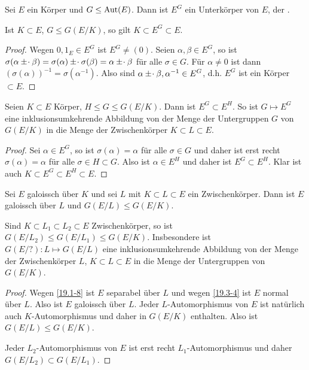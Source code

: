 \begin{lem} \label{19.4-9}
	Sei $E$ ein Körper und $G \le \operatorname{Aut}(E)$.
	Dann ist $E^G$ ein Unterkörper von $E$, der .
	\begin{note}
		Ist $K \subset E$, $G \le G(E / K)$, so gilt $K \subset E^G \subset E$.
	\end{note}
	\begin{proof}
		Wegen $0, 1_E \in E^G$ ist $E^G \neq (0)$.
		Seien $\alpha, \beta \in E^G$, so ist $\sigma(\alpha \mathbin { \pm \mkern1mu \cdot } \beta) = \sigma(\alpha) \mathbin { \pm \mkern1mu \cdot } \sigma(\beta) = \alpha \mathbin { \pm \mkern1mu \cdot } \beta$ für alle $\sigma \in G$.
		Für $\alpha \neq 0$ ist dann $(\sigma(\alpha))^{-1} = \sigma(\alpha^{-1})$.
		Also sind $\alpha \mathbin { \pm \mkern1mu \cdot } \beta, \alpha^{-1} \in E^G$, d.h. $E^G$ ist ein Körper $\subset E$.
	\end{proof}
\end{lem}

\begin{lem} \label{19.4-10}
	Seien $K \subset E$ Körper, $H \le G \le G(E / K)$.
	Dann ist $E^G \subset E^H$.
	So ist $G \mapsto E^G$ eine inklusionsumkehrende Abbildung von der Menge der Untergruppen $G$ von $G(E / K)$ in die Menge der Zwischenkörper $K \subset L \subset E$.
	\begin{proof}
		Sei $\alpha \in E^G$, so ist $\sigma(\alpha) = \alpha$ für alle $\sigma \in G$ und daher ist erst recht $\sigma(\alpha) = \alpha$ für alle $\sigma \in H \subset G$.
		Also ist $\alpha \in E^H$ und daher ist $E^G \subset E^H$.
		Klar ist auch $K \subset E^G \subset E^H \subset E$.
	\end{proof}
\end{lem}

\begin{lem} \label{19.4-11}
	Sei $E$ galoissch über $K$ und sei $L$ mit $K \subset L \subset E$ ein Zwischenkörper.
	Dann ist $E$ galoissch über $L$ und $G(E / L) \le G(E / K)$.

	Sind $K \subset L_1 \subset L_2 \subset E$ Zwischenkörper, so ist $G(E / L_2) \le G(E / L_1) \le G(E / K)$.
	Insbesondere ist $G(E / ?): L \mapsto G(E / L)$ eine inklusionsumkehrende Abbildung von der Menge der Zwischenkörper $L$, $K \subset L \subset E$ in die Menge der Untergruppen von $G(E / K)$.
	\begin{proof}
		Wegen \ref{19.1-8} ist $E$ separabel über $L$ und wegen \ref{19.3-4} ist $E$ normal über $L$.
		Also ist $E$ galoissch über $L$.
		Jeder $L$-Automorphismus von $E$ ist natürlich auch $K$-Automorphismus und daher in $G(E / K)$ enthalten.
		Also ist $G(E / L) \le G(E / K)$.

		Jeder $L_2$-Automorphismus von $E$ ist erst recht $L_1$-Automorphismus und daher $G(E / L_2) \subset G(E / L_1)$.
	\end{proof}
\end{lem}

